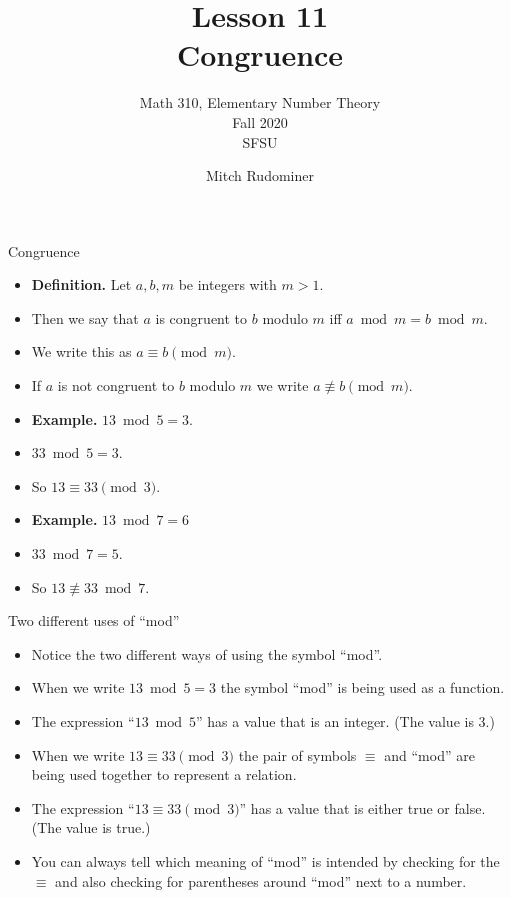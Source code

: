 \documentclass{beamer}
\title{Lesson 11 \\ Congruence}
\subtitle{Math 310, Elementary Number Theory \\ Fall 2020 \\ SFSU}
\author{Mitch Rudominer}
\date{}
\begin{document}
\begin{frame}
  \titlepage
\end{frame}

\begin{frame}{Congruence}

\begin{itemize}
  \item \textbf{Definition.} Let $a,b,m$ be integers with $m>1$.
  \item Then we say that $a$ is congruent to $b$ modulo $m$ iff $a\bmod m = b\bmod m$.
  \item We write this as $a\equiv b \pmod m$.
  \item If $a$ is not congruent to $b$ modulo $m$ we write $a\not\equiv b \pmod m$.
  \item \textbf{Example.} $13\bmod 5 = 3$.
  \item $33 \bmod 5 = 3$.
  \item So $13 \equiv 33 \pmod 3$.
  \item \textbf{Example.} $13 \bmod 7 = 6$
  \item $33 \bmod 7 = 5$.
  \item So $13 \not\equiv 33 \bmod 7$.
\end{itemize}

\end{frame}

\begin{frame}{Two different uses of ``mod''}

\begin{itemize}
  \item Notice the two different ways of using the symbol ``mod''.
  \item When we write $13\bmod 5 = 3$ the symbol ``mod'' is being used as a function.
  \item The expression ``$13\bmod 5$'' has a value that is an integer. (The value is 3.)
  \item When we write $13 \equiv 33 \pmod 3$ the pair of symbols $\equiv$ and ``mod'' are being
  used together to represent a relation.
  \item The expression ``$13 \equiv 33 \pmod 3$'' has a value that is either true or false. (The value is true.)
  \item You can always tell which meaning of ``mod'' is intended by checking for the $\equiv$ and
  also checking for parentheses around  ``mod'' next to a number.
\end{itemize}

\end{frame}
\end{document}
